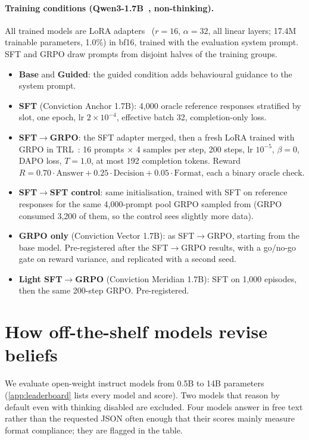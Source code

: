 \documentclass[11pt]{article}
\begin{document}
\paragraph{Training conditions (Qwen3-1.7B~\citep{qwen2025qwen3}, non-thinking).} All trained models are LoRA
adapters~\citep{hu2022lora} ($r=16$, $\alpha=32$, all linear layers; 17.4M trainable parameters, 1.0\%) in bf16,
trained with the evaluation system prompt. SFT and GRPO draw prompts from disjoint halves of the training groups.
\begin{itemize}[leftmargin=*]
\item \textbf{Base} and \textbf{Guided}: the guided condition adds behavioural guidance to the system prompt.
\item \textbf{SFT} (Conviction Anchor 1.7B): 4,000 oracle reference responses stratified by slot, one epoch, lr $2\times10^{-4}$, effective
batch 32, completion-only loss.
\item \textbf{SFT$\to$GRPO}: the SFT adapter merged, then a fresh LoRA trained with GRPO in TRL~\citep{vonwerra2020trl}:
16 prompts $\times$ 4 samples per step, 200 steps, lr $10^{-5}$, $\beta=0$, DAPO loss, $T=1.0$, at most 192
completion tokens. Reward $R = 0.70\cdot\text{Answer} + 0.25\cdot\text{Decision} + 0.05\cdot\text{Format}$, each a
binary oracle check.
\item \textbf{SFT$\to$SFT control}: same initialisation, trained with SFT on reference responses for the same
4,000-prompt pool GRPO sampled from (GRPO consumed 3,200 of them, so the control sees slightly more data).
\item \textbf{GRPO only} (Conviction Vector 1.7B): as SFT$\to$GRPO, starting from the base model. Pre-registered after the
SFT$\to$GRPO results, with a go/no-go gate on reward variance, and replicated with a second seed.
\item \textbf{Light SFT$\to$GRPO} (Conviction Meridian 1.7B): SFT on 1,000 episodes, then the same 200-step GRPO. Pre-registered.
\end{itemize}

\section{How off-the-shelf models revise beliefs}
\label{sec:bench-results}

We evaluate \nnShelf{} open-weight instruct models from 0.5B to 14B parameters (\cref{app:leaderboard} lists every
model and score). Two models that reason by default even with thinking disabled are excluded. Four models
answer in free text rather than the requested JSON often enough that their scores mainly measure format compliance;
they are flagged in the table.
\end{document}
